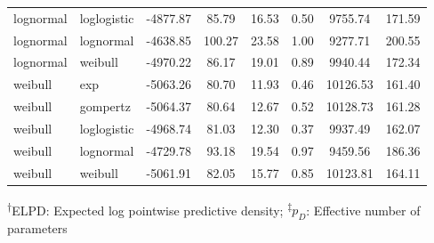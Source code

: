 \documentclass[AMA,STIX1COL]{WileyNJD-v2}
\begin{document}
\begin{table}[H]
\begin{tabular}{l l c c c c c c}
lognormal & loglogistic & -4877.87 & 85.79 & 16.53 & 0.50 & 9755.74 & 171.59\\
lognormal & lognormal & -4638.85 & 100.27 & 23.58 & 1.00 & 9277.71 & 200.55\\
lognormal & weibull & -4970.22 & 86.17 & 19.01 & 0.89 & 9940.44 & 172.34\\
weibull & exp & -5063.26 & 80.70 & 11.93 & 0.46 & 10126.53 & 161.40\\
weibull & gompertz & -5064.37 & 80.64 & 12.67 & 0.52 & 10128.73 & 161.28\\
weibull & loglogistic & -4968.74 & 81.03 & 12.30 & 0.37 & 9937.49 & 162.07\\
weibull & lognormal & -4729.78 & 93.18 & 19.54 & 0.97 & 9459.56 & 186.36\\
weibull & weibull & -5061.91 & 82.05 & 15.77 & 0.85 & 10123.81 & 164.11\\
\bottomrule
\end{tabular}
\begin{tablenotes}%
\textsuperscript{$\dagger$}ELPD: Expected log pointwise predictive density;
\textsuperscript{$\ddagger$}$p_D$: Effective number of parameters
\end{tablenotes}
\end{table}
\end{document}
